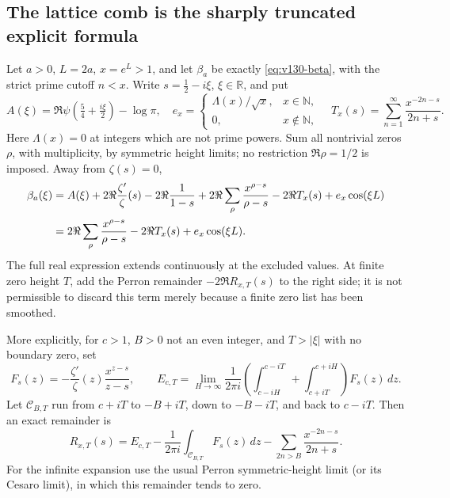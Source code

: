 \subsection*{The lattice comb is the sharply truncated explicit formula}

\begin{proposition}
\label{prop:v146-beta-explicit}
Let $a>0$, $L=2a$, $x=e^L>1$, and let $\beta_a$ be exactly
\eqref{eq:v130-beta}, with the strict prime cutoff $n<x$. Write
$s=\tfrac12-i\xi$, $\xi\in\mathbb R$, and put
\[
 A(\xi)=\Re\psi(\tfrac54+\tfrac{i\xi}2)-\log\pi,
 \quad e_x=\begin{cases}\Lambda(x)/\sqrt{x},&x\in\mathbb N,\\0,&x\notin\mathbb N,\end{cases}
 \quad T_x(s)=\sum_{n=1}^\infty\frac{x^{-2n-s}}{2n+s}.
\]
Here $\Lambda(x)=0$ at integers which are not prime powers. Sum all
nontrivial zeros $\rho$, with multiplicity, by symmetric height limits;
no restriction $\Re\rho=1/2$ is imposed. Away from $\zeta(s)=0$,
\begin{align}
 \beta_a(\xi)={}&A(\xi)+2\Re\frac{\zeta'}\zeta(s)
       -2\Re\frac1{1-s}
       +2\Re\sum_\rho\frac{x^{\rho-s}}{\rho-s}
       -2\Re T_x(s)+e_x\cos(\xi L) \notag\\
 ={}&2\Re\sum_\rho\frac{x^{\rho-s}}{\rho-s}
       -2\Re T_x(s)+e_x\cos(\xi L).
 \label{eq:v146-beta-explicit}
\end{align}
The full real expression extends continuously at the excluded values.
At finite zero height $T$, add the Perron remainder $-2\Re R_{x,T}(s)$
to the right side; it is not permissible to discard this term merely
because a finite zero list has been smoothed.

More explicitly, for $c>1$, $B>0$ not an even integer, and $T>|\xi|$
with no boundary zero, set
\[
 F_s(z)=-\frac{\zeta'}\zeta(z)\frac{x^{z-s}}{z-s},\qquad
 E_{c,T}=\lim_{H\to\infty}\frac1{2\pi i}
 \left(\int_{c-iH}^{c-iT}+\int_{c+iT}^{c+iH}\right)F_s(z)\,dz.
\]
Let $\mathcal C_{B,T}$ run from $c+iT$ to $-B+iT$, down to
$-B-iT$, and back to $c-iT$. Then an exact remainder is
\begin{equation}\label{eq:v146-perron-remainder}
 R_{x,T}(s)=E_{c,T}-\frac1{2\pi i}\int_{\mathcal C_{B,T}}F_s(z)\,dz
       -\sum_{2n>B}\frac{x^{-2n-s}}{2n+s}.
\end{equation}
For the infinite expansion use the usual Perron symmetric-height
limit (or its Cesaro limit), in which this remainder tends to zero.
\end{proposition}
